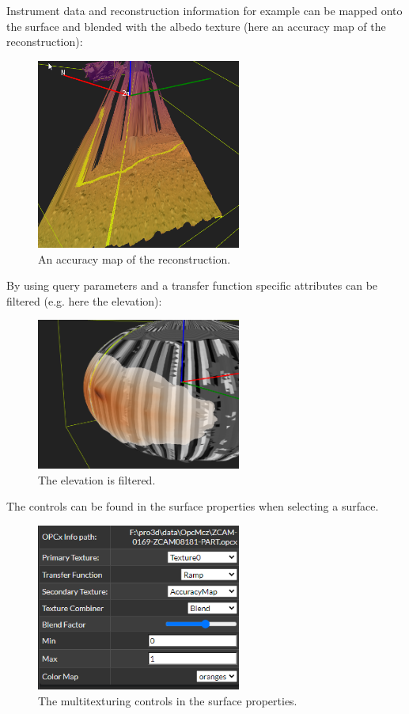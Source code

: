 Instrument data and reconstruction information for example can be mapped onto the surface and blended with the albedo texture (here an accuracy map of the reconstruction):

\begin{figure}[h!]
	\centering
	\includegraphics[width=0.6\textwidth]{pics/AccuracyMap.png}
	\caption{An accuracy map of the reconstruction.}
\end{figure}

By using query parameters and a transfer function specific attributes can be filtered (e.g. here the elevation):

\begin{figure}[h!]
	\centering
	\includegraphics[width=0.6\textwidth]{pics/FilteredElevation.png}
	\caption{The elevation is filtered.}
\end{figure}

The controls can be found in the surface properties when selecting a surface. 

\begin{figure}[h!]
	\centering
	\includegraphics[width=0.6\textwidth]{pics/MultitexControls.png}
	\caption{The multitexturing controls in the surface properties.}
\end{figure}

